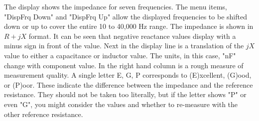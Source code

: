 %
The display shows the impedance for seven frequencies.
The menu items, "DispFrq Down" and "DispFrq Up" allow the displayed frequencies to be shifted down or up to cover the entire 10 to 40,000 Hz range.  The impedance is shown in  \(R+jX\) format. It can be seen that negative reactance values display with a minus sign in front of the value. Next in the display line is a translation of the  \(jX\) value to either a capacitance or inductor value. The units, in this case,  "nF" change with component value.  In the right hand column is a rough measure of measurement quality. A single letter E, G, P corresponds to (E)xcellent, (G)ood, or (P)oor. These indicate the difference between the impedance and the reference resistance.
They should not be taken too literally, but if the letter shows "P" or even "G",  you might consider the values and whether to re-measure with the other reference resistance.

